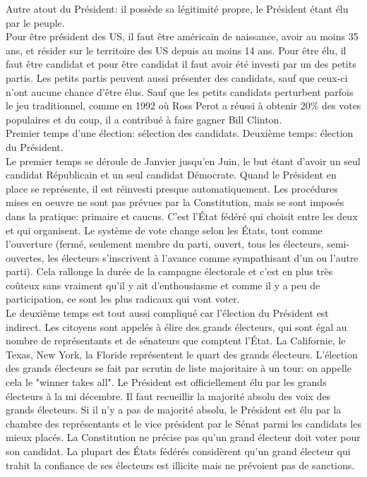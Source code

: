 \documentclass[10pt, a4paper, openany]{book}
\begin{document}
Autre atout du Président: il possède sa légitimité propre, le Président étant élu par le peuple. \\
Pour être président des US, il faut être américain de naissance, avoir au moins 35 ans, et résider sur le territoire des US depuis au moins 14 ans. Pour être élu, il faut être candidat et pour être candidat il faut avoir été investi par un des petits partis. Les petits partis peuvent aussi présenter des candidats, sauf que ceux-ci n'ont aucune chance d'être élus. Sauf que les petits candidats perturbent parfois le jeu traditionnel, comme en 1992 où Ross Perot a réussi à obtenir 20\% des votes populaires et du coup, il a contribué à faire gagner Bill Clinton. \\
Premier temps d'une élection: sélection des candidats. Deuxième temps: élection du Président. \\
Le premier temps se déroule de Janvier jusqu'en Juin, le but étant d'avoir un seul candidat Républicain et un seul candidat Démocrate. Quand le Président en place se représente, il est réinvesti presque automatiquement. Les procédures mises en oeuvre ne sont pas prévues par la Constitution, mais se sont imposés dans la pratique: primaire et caucus. C'est l'État fédéré qui choisit entre les deux et qui organisent. Le système de vote change selon les États, tout comme l'ouverture (fermé, seulement membre du parti, ouvert, tous les électeurs, semi-ouvertes, les électeurs s'inscrivent à l'avance comme sympathisant d'un ou l'autre parti). Cela rallonge la durée de la campagne électorale et c'est en plus très coûteux sans vraiment qu'il y ait d'enthousiasme et comme il y a peu de participation, ce sont les plus radicaux qui vont voter. \\
Le deuxième temps est tout aussi compliqué car l'élection du Président est indirect. Les citoyens sont appelés à élire des grands électeurs, qui sont égal au nombre de représentants et de sénateurs que comptent l'État. La Californie, le Texas, New York, la Floride représentent le quart des grands électeurs. L'élection des grands électeurs se fait par scrutin de liste majoritaire à un tour: on appelle cela le "winner takes all". Le Président est officiellement élu par les grands électeurs à la mi décembre. Il faut recueillir la majorité absolu des voix des grands électeurs. Si il n'y a pas de majorité absolu, le Président est élu par la chambre des représentants et le vice président par le Sénat parmi les candidats les mieux placés. La Constitution ne précise pas qu'un grand électeur doit voter pour son candidat. La plupart des États fédérés considèrent qu'un grand électeur qui trahit la confiance de ses électeurs est illicite mais ne prévoient pas de sanctions. 
\end{document}
